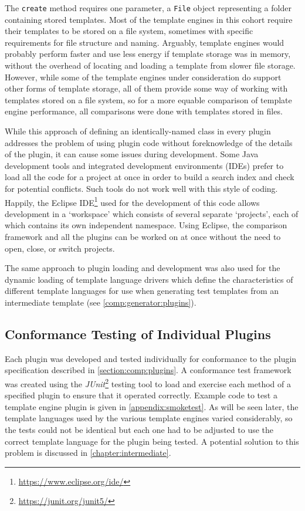 The \verb!create! method requires one parameter, a \verb!File! object representing a folder containing stored templates. Most of the template engines in this cohort require their templates to be stored on a file system, sometimes with specific requirements for file structure and naming. Arguably, template engines would probably perform faster and use less energy if template storage was in memory, without the overhead of locating and loading a template from slower file storage. However, while some of the template engines under consideration do support other forms of template storage, all of them provide some way of working with templates stored on a file system, so for a more equable comparison of template engine performance, all comparisons were done with templates stored in files.

While this approach of defining an identically-named class in every plugin addresses the problem of using plugin code without foreknowledge of the details of the plugin, it can cause some issues during development. Some Java development tools and integrated development environments (IDEs) prefer to load all the code for a project at once in order to build a search index and check for potential conflicts. Such tools do not work well with this style of coding. Happily, the Eclipse IDE\footnote{\url{https://www.eclipse.org/ide/}} used for the development of this code allows development in a `workspace' which consists of several separate `projects', each of which contains its own independent namespace. Using Eclipse, the comparison framework and all the plugins can be worked on at once without the need to open, close, or switch projects.

The same approach to plugin loading and development was also used for the dynamic loading of template language drivers which define the characteristics of different template languages for use when generating test templates from an intermediate template (see \autoref{comp:generator:plugins}).

\subsection{Conformance Testing of Individual Plugins}
\label{section:comp:testing}

Each plugin was developed and tested individually for conformance to the plugin specification described in \autoref{section:comp:plugins}. A conformance test framework was created using the \emph{JUnit}\footnote{\url{https://junit.org/junit5/}} testing tool to load and exercise each method of a specified plugin to ensure that it operated correctly. Example code to test a template engine plugin is given in \autoref{appendix:smoketest}. As will be seen later, the template languages used by the various template engines varied considerably, so the tests could not be identical but each one had to be adjusted to use the correct template language for the plugin being tested. A potential solution to this problem is discussed in \autoref{chapter:intermediate}.

